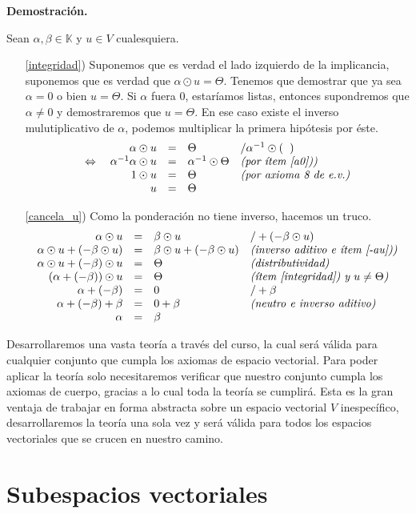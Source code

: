\documentclass[12pt]{book}
\def\K{\mathbb{K}}
\begin{document}
{\bf Demostración.} { Sean $\alpha,\beta\in\K$ y $u\in V$ cualesquiera.
\begin{itemize}
\item[\ref{integridad})] Suponemos que es verdad el lado izquierdo de la implicancia, suponemos que es verdad que $\alpha\odot u=\Theta$.
Tenemos que demostrar que ya sea  $\alpha=0$ o bien $u=\Theta$.
Si $\alpha$ fuera 0, estaríamos listas, entonces supondremos que $\alpha\not =0$ y demostraremos que $u=\Theta$.
En ese caso existe el inverso mulutiplicativo de $\alpha$, podemos multiplicar la primera hipótesis por éste.
$$\begin{array}{rcll}
\alpha\odot u&=&\Theta &/\alpha^{-1}\odot(\phantom{h})\\
\Leftrightarrow\quad\alpha^{-1}\alpha\odot u&=&\alpha^{-1}\odot \Theta &\textit{(por ítem \ref{a0}))}\\
1\odot u&=&\Theta&\textit{(por axioma 8 de e.v.)}\\
u&=&\Theta
\end{array}$$
\item[\ref{cancela_u})] Como la ponderación no tiene inverso, hacemos un truco.
$$
\begin{array}{rcll}
\alpha\odot u&=&\beta\odot u & /+(-\beta\odot u)\\
\alpha\odot u+(-\beta\odot u)&=&\beta\odot u+(-\beta\odot u)&\textit{(inverso aditivo e ítem \ref{-au}))}\\
\alpha\odot u+(-\beta)\odot u&=&\Theta &\textit{(distributividad)}\\
(\alpha+(-\beta))\odot u&=&\Theta &\textit{(ítem \ref{integridad}) y $u\not=\Theta$)}\\
\alpha+(-\beta)&=&0&/+\beta\\
\alpha+(-\beta)+\beta&=&0+\beta&\textit{(neutro e inverso aditivo)}\\
\alpha&=&\beta&
\end{array}
$$
\end{itemize}
}
Desarrollaremos una vasta teoría a través del curso, la cual será válida para cualquier conjunto que cumpla los axiomas de espacio vectorial.
Para poder aplicar la teoría solo necesitaremos verificar que nuestro conjunto cumpla los axiomas de cuerpo, gracias a lo cual toda la teoría se cumplirá.
Esta es la gran ventaja de trabajar en forma abstracta sobre un espacio vectorial $V$ inespecífico, desarrollaremos la teoría una sola vez y será válida para todos los espacios vectoriales que se crucen en nuestro camino.


\section{Subespacios vectoriales}
\end{document}
